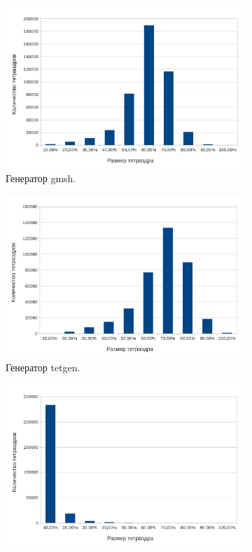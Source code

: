 \begin{figure}[htp]
\begin{subfigure}[b]{0.5\textwidth}
\centering
\includegraphics[width=\textwidth]{png/gmsh-stats.png}
\caption{Генератор gmsh.}
\end{subfigure}
\begin{subfigure}[b]{0.5\textwidth}
\centering
\includegraphics[width=\textwidth]{png/tetgen-stats.png}
\caption{Генератор tetgen.}
\end{subfigure}
\begin{subfigure}[b]{0.5\textwidth}
\centering
\includegraphics[width=\textwidth]{png/ani3d-stats.png}

\end{subfigure}
\end{figure}
